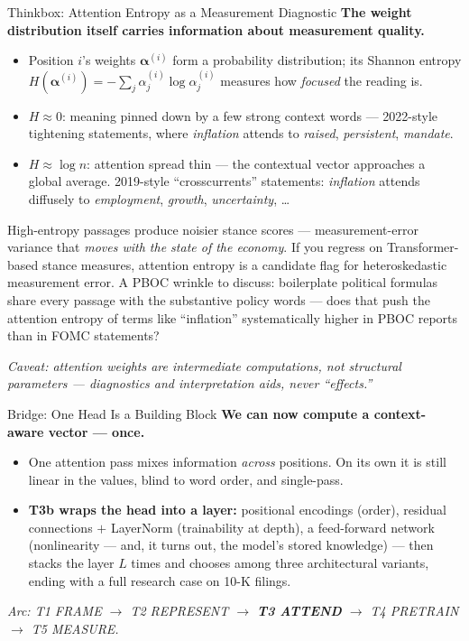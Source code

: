 \begin{frame}{Thinkbox: Attention Entropy as a Measurement Diagnostic}
\small
\textbf{The weight distribution itself carries information about measurement quality.}
\begin{itemize}
\item Position $i$'s weights $\boldsymbol\alpha^{(i)}$ form a probability distribution; its Shannon entropy $H(\boldsymbol\alpha^{(i)}) = -\sum_j \alpha_j^{(i)}\log\alpha_j^{(i)}$ measures how \emph{focused} the reading is.
\item $H \approx 0$: meaning pinned down by a few strong context words --- 2022-style tightening statements, where \emph{inflation} attends to \emph{raised}, \emph{persistent}, \emph{mandate}.
\item $H \approx \log n$: attention spread thin --- the contextual vector approaches a global average. 2019-style ``crosscurrents'' statements: \emph{inflation} attends diffusely to \emph{employment}, \emph{growth}, \emph{uncertainty}, \ldots
\end{itemize}
\begin{cautionbox}
High-entropy passages produce noisier stance scores --- measurement-error variance that \emph{moves with the state of the economy}. If you regress on Transformer-based stance measures, attention entropy is a candidate flag for heteroskedastic measurement error. A PBOC wrinkle to discuss: boilerplate political formulas share every passage with the substantive policy words --- does that push the attention entropy of terms like ``inflation'' systematically higher in PBOC reports than in FOMC statements?
\end{cautionbox}
\smallskip
\textit{\footnotesize Caveat: attention weights are intermediate computations, not structural parameters --- diagnostics and interpretation aids, never ``effects.''}
\end{frame}

\begin{frame}{Bridge: One Head Is a Building Block}
\textbf{We can now compute a context-aware vector --- once.}
\begin{itemize}
\item One attention pass mixes information \emph{across} positions. On its own it is still linear in the values, blind to word order, and single-pass.
\item \textbf{T3b wraps the head into a layer:} positional encodings (order), residual connections $+$ LayerNorm (trainability at depth), a feed-forward network (nonlinearity --- and, it turns out, the model's stored knowledge) --- then stacks the layer $L$ times and chooses among three architectural variants, ending with a full research case on 10-K filings.
\end{itemize}
\bigskip
\centering\footnotesize\textit{Arc: T1 FRAME $\to$ T2 REPRESENT $\to$ \textbf{T3 ATTEND} $\to$ T4 PRETRAIN $\to$ T5 MEASURE.}
\end{frame}


